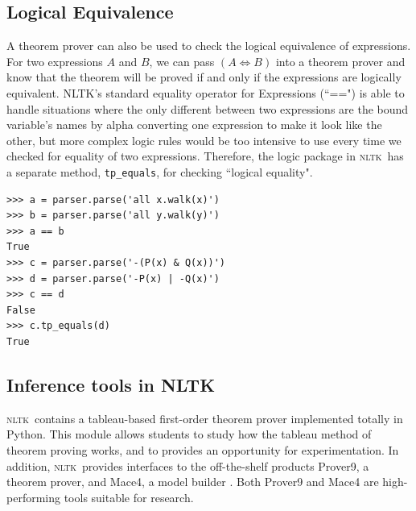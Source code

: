 \documentclass[11pt,a4paper]{article}
\newcommand{\NLTK}{\textsc{nltk}}
\newcommand{\dhgcode}[1]{{\tt #1}}
\begin{document}
\subsection{Logical Equivalence}
A theorem prover can also be used to check the logical equivalence of
expressions.  For two expressions $A$ and $B$, we can pass $(A\iff B)$
into a theorem prover and know that the theorem will be proved if and
only if the expressions are logically equivalent.  NLTK's standard
equality operator for Expressions (``==") is able to handle situations
where the only different between two expressions are the bound
variable's names by alpha converting one expression to make it look
like the other, but more complex logic rules would be too intensive to
use every time we checked for equality of two expressions.  Therefore,
the logic package in \NLTK\ has a separate method,
\dhgcode{tp\_equals}, for checking ``logical equality".

\begin{verbatim}
>>> a = parser.parse('all x.walk(x)')
>>> b = parser.parse('all y.walk(y)')
>>> a == b
True
>>> c = parser.parse('-(P(x) & Q(x))')
>>> d = parser.parse('-P(x) | -Q(x)')
>>> c == d
False
>>> c.tp_equals(d)
True
\end{verbatim}

\subsection{Inference tools in NLTK}
\NLTK\ contains a tableau-based first-order theorem prover implemented
totally in Python.  This module allows students to study how the
tableau method of theorem proving works, and to provides an
opportunity for experimentation.  In addition, \NLTK\ provides
interfaces to the off-the-shelf products Prover9, a theorem prover,
and Mace4, a model builder \cite{McCune}.  Both Prover9 and Mace4 are
high-performing tools suitable for research.



\end{document}
